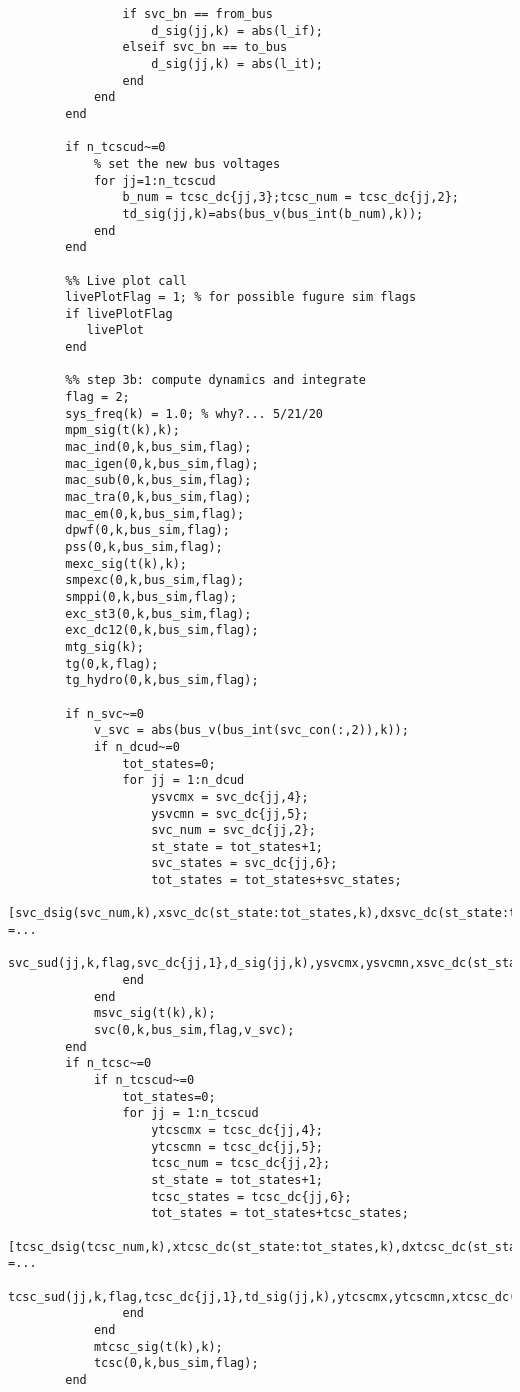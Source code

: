 \documentclass[12pt]{article}
\begin{document}
\begin{verbatim}
                if svc_bn == from_bus
                    d_sig(jj,k) = abs(l_if);
                elseif svc_bn == to_bus
                    d_sig(jj,k) = abs(l_it); 
                end
            end
        end
        
        if n_tcscud~=0
            % set the new bus voltages
            for jj=1:n_tcscud
                b_num = tcsc_dc{jj,3};tcsc_num = tcsc_dc{jj,2};
                td_sig(jj,k)=abs(bus_v(bus_int(b_num),k));
            end
        end
        
        %% Live plot call
        livePlotFlag = 1; % for possible fugure sim flags
        if livePlotFlag
           livePlot
        end
        
        %% step 3b: compute dynamics and integrate
        flag = 2;
        sys_freq(k) = 1.0; % why?... 5/21/20
        mpm_sig(t(k),k);
        mac_ind(0,k,bus_sim,flag);
        mac_igen(0,k,bus_sim,flag);
        mac_sub(0,k,bus_sim,flag);
        mac_tra(0,k,bus_sim,flag);
        mac_em(0,k,bus_sim,flag);
        dpwf(0,k,bus_sim,flag);
        pss(0,k,bus_sim,flag);
        mexc_sig(t(k),k);
        smpexc(0,k,bus_sim,flag);
        smppi(0,k,bus_sim,flag);
        exc_st3(0,k,bus_sim,flag);
        exc_dc12(0,k,bus_sim,flag);
        mtg_sig(k);
        tg(0,k,flag);
        tg_hydro(0,k,bus_sim,flag);
        
        if n_svc~=0
            v_svc = abs(bus_v(bus_int(svc_con(:,2)),k));
            if n_dcud~=0
                tot_states=0;
                for jj = 1:n_dcud
                    ysvcmx = svc_dc{jj,4};
                    ysvcmn = svc_dc{jj,5};
                    svc_num = svc_dc{jj,2};
                    st_state = tot_states+1; 
                    svc_states = svc_dc{jj,6}; 
                    tot_states = tot_states+svc_states;
                    [svc_dsig(svc_num,k),xsvc_dc(st_state:tot_states,k),dxsvc_dc(st_state:tot_states,k)] =...
                        svc_sud(jj,k,flag,svc_dc{jj,1},d_sig(jj,k),ysvcmx,ysvcmn,xsvc_dc(st_state:tot_states,k));
                end
            end
            msvc_sig(t(k),k);
            svc(0,k,bus_sim,flag,v_svc);
        end
        if n_tcsc~=0
            if n_tcscud~=0
                tot_states=0;
                for jj = 1:n_tcscud
                    ytcscmx = tcsc_dc{jj,4};
                    ytcscmn = tcsc_dc{jj,5};
                    tcsc_num = tcsc_dc{jj,2};
                    st_state = tot_states+1; 
                    tcsc_states = tcsc_dc{jj,6}; 
                    tot_states = tot_states+tcsc_states;
                    [tcsc_dsig(tcsc_num,k),xtcsc_dc(st_state:tot_states,k),dxtcsc_dc(st_state:tot_states,k)] =...
                        tcsc_sud(jj,k,flag,tcsc_dc{jj,1},td_sig(jj,k),ytcscmx,ytcscmn,xtcsc_dc(st_state:tot_states,k));
                end
            end
            mtcsc_sig(t(k),k);
            tcsc(0,k,bus_sim,flag);
        end
        

\end{verbatim}
\end{document}
